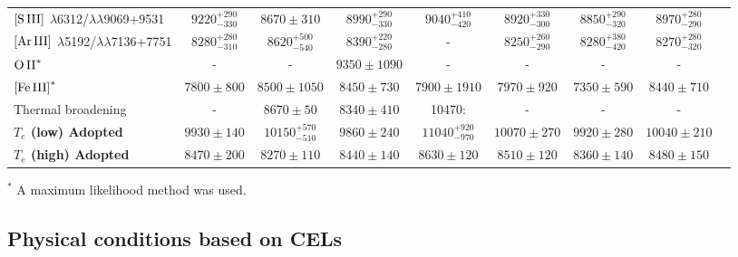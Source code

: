 \documentclass[fleqn,usenatbib]{mnras}
\begin{document}
\begin{table*}
\begin{adjustbox}{width=\textwidth}
\begin{tabular}{lcccccccc}
$\mbox{[S}\thinspace \mbox{III]}$ $\lambda$6312/$\lambda \lambda$9069+9531 & $9220^{+290} _{-330}$ & $8670\pm 310$ & $8990^{+290} _{-330}$&  $9040^{+410} _{-420}$& $8920^{+330} _{-300}$ & $8850^{+290} _{-320}$& $8970^{+280} _{-290}$\\

$\mbox{[Ar}\thinspace \mbox{III]}$ $\lambda$5192/$\lambda \lambda$7136+7751  & $8280^{+280} _{-310}$ & $8620^{+500} _{-540}$ & $8390^{+220} _{-280}$&-& $8250^{+260} _{-290}$& $8280^{+380} _{-420}$& $8270^{+280} _{-320}$\\

$\mbox{O}\thinspace \mbox{II}^{*}$ & - & - & $9350 \pm 1090$ & - & - & - &-\\


$\mbox{[Fe}\thinspace \mbox{III]}^{*}$ & $7800 \pm 800$ & $8500 \pm 1050$ & $8450 \pm 730$ & $7900 \pm 1910$ &$7970 \pm 920$ & $7350 \pm 590$ & $8440 \pm 710$  \\


Thermal broadening  & - & $8670 \pm 50$ & $8340 \pm 410$ & 10470: & -&-&-\\

 
\textbf{\boldmath${T_e}$ (low) Adopted} &\boldmath${ 9930 \pm  140 }$ & \boldmath${ 10150^{+570} _{-510} }$& \boldmath${ 9860 \pm  240 }$ & \boldmath${11040^{+920} _{-970}}$&\boldmath${10070 \pm 270}$&\boldmath${9920 \pm 280}$&\boldmath${10040 \pm 210}$\\


\textbf{\boldmath${T_e}$ (high) Adopted} &\boldmath${8470 \pm 200 }$&\boldmath${8270 \pm 110 }$&\boldmath${8440 \pm 140 }$&\boldmath${ 8630 \pm 120 }$&\boldmath${8510 \pm 120 }$&\boldmath${8360 \pm 140 }$&\boldmath${8480 \pm 150 }$\\

\hline
\end{tabular}
\end{adjustbox}
\begin{description}
\item $^*$ A maximum likelihood method was used. \\
\end{description}
\end{table*}




\subsection{Physical conditions based on CELs}
\label{subsec:physical_conditions_cels}
\end{document}
